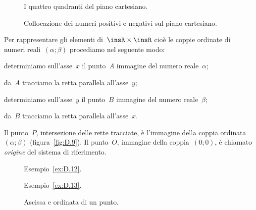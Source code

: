 \begin{figure}[hbt]
 \begin{minipage}[t]{.45\textwidth}
 \centering
 \caption{I quattro quadranti del piano cartesiano.}\label{fig:D.7}
 \end{minipage}\hfil
 \begin{minipage}[t]{.45\textwidth}
 \centering
 \caption{Collocazione dei numeri positivi e negativi sul piano cartesiano.}\label{fig:D.8}
 \end{minipage}
\end{figure}

Per rappresentare gli elementi di~$\insR\times \insR$ cioè le coppie ordinate di numeri reali~$(\alpha; \beta)$ procediamo nel seguente modo:
\begin{itemize*}
\item determiniamo sull'asse~$x$ il punto~$A$ immagine del numero reale~$\alpha$;
\item da~$A$ tracciamo la retta parallela all'asse~$y$;
\item determiniamo sull'asse~$y$ il punto~$B$ immagine del numero reale~$\beta$;
\item da~$B$ tracciamo la retta parallela all'asse~$x$.
\end{itemize*}
Il punto~$P$, intersezione delle rette tracciate, è l'immagine della coppia ordinata~$(\alpha; \beta)$ (figura~\ref{fig:D.9}).  Il punto~$O$, immagine della coppia~$(0;0)$, è chiamato \emph{origine} del sistema di riferimento.

\begin{figure}[hbt]
 \begin{minipage}[t]{.3\textwidth}
 \centering
 \caption{Esempio~\ref{ex:D.12}.}\label{fig:D.9}
 \end{minipage}\hfil
 \begin{minipage}[t]{.45\textwidth}
 \centering
 \caption{Esempio~\ref{ex:D.13}.}\label{fig:D.10}
 \end{minipage}\hfil
 \begin{minipage}[t]{.25\textwidth}
 \centering
 \caption{Ascissa e ordinata di un punto.}\label{fig:D.11}
\end{minipage}
 \end{figure}


